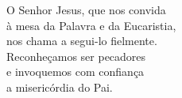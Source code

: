 O Senhor Jesus, que nos convida \\ à mesa da Palavra e da Eucaristia, \\ nos chama a segui-lo fielmente. \\ Reconheçamos ser pecadores \\ e invoquemos com confiança \\ a misericórdia do Pai.
\vspace{.2cm} \\
